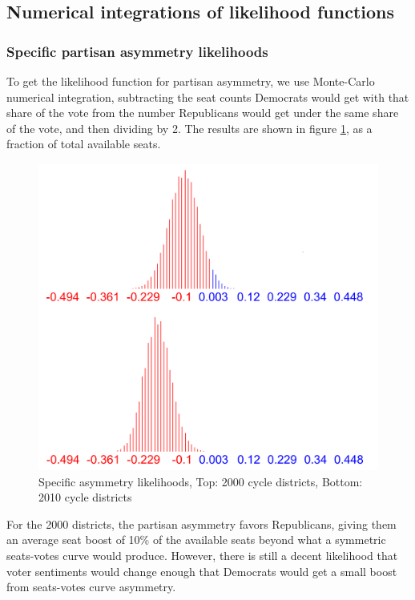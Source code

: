 \documentclass[preprint,12pt]{article}
\begin{document}
\subsection{Numerical integrations of likelihood functions}

\subsubsection{Specific partisan asymmetry likelihoods}
 
To get the likelihood function for partisan asymmetry, we use Monte-Carlo numerical integration, subtracting the seat counts Democrats would get with that share of the vote from the number Republicans would get under the same share of the vote, and then dividing by 2. The results are shown in figure \ref{fig:LikelihoodsAsymmetry}, as a fraction of total available seats.
 
\begin{figure}[htb!]
    \begin{center}
        \includegraphics[scale=0.25]{../Figures/WI_compared/asymmetry_cropped.png}
        \caption{Specific asymmetry likelihoods, Top: 2000 cycle districts, Bottom: 2010 cycle districts}\label{fig:LikelihoodsAsymmetry}
    \end{center}
\end{figure}
 
For the 2000 districts, the partisan asymmetry favors Republicans, giving them an average seat boost of 10\% of the available seats beyond what a symmetric seats-votes curve would produce.  However, there is still a decent likelihood that voter sentiments would change enough that Democrats would get a small boost from seats-votes curve asymmetry.
\end{document}
